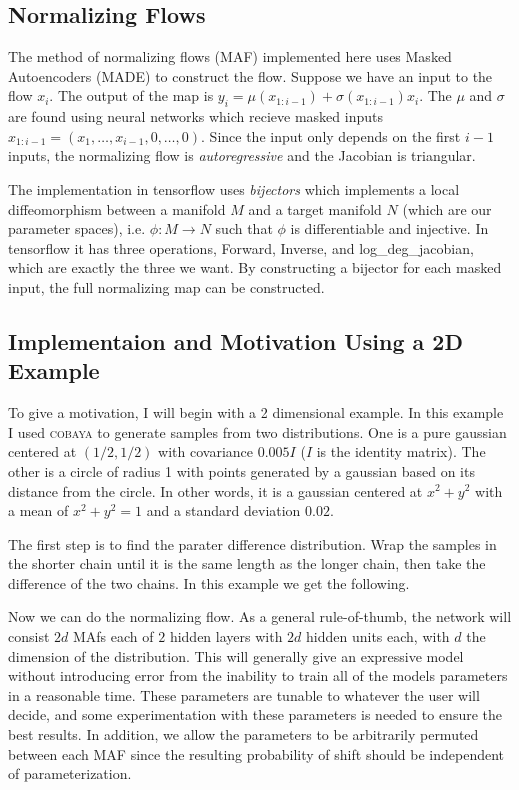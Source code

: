 \subsection{Normalizing Flows}
The method of normalizing flows (MAF) implemented here uses Masked Autoencoders (MADE) to construct the flow. Suppose we have an input to the flow $x_i$. The output of the map is $y_i= \mu(x_{1:i-1})+\sigma(x_{1:i-1})x_i$. The $\mu$ and $\sigma$ are found using neural networks which recieve masked inputs $x_{1:i-1}=(x_1,\ldots,x_{i-1},0,\ldots,0)$. Since the input only depends on the first $i-1$ inputs, the normalizing flow is \textit{autoregressive} and the Jacobian is triangular.

The implementation in tensorflow uses \textit{bijectors} which implements a local diffeomorphism between a manifold $M$ and a target manifold $N$ (which are our parameter spaces), i.e. $\phi:M\rightarrow N$ such that $\phi$ is differentiable and injective. In tensorflow it has three operations, Forward, Inverse, and log\_deg\_jacobian, which are exactly the three we want. By constructing a bijector for each masked input, the full normalizing map can be constructed.

\subsection{Implementaion and Motivation Using a 2D Example}
To give a motivation, I will begin with a 2 dimensional example. In this example I used \textsc{cobaya} to generate samples from two distributions. One is a pure gaussian centered at $(1/2,1/2)$ with covariance $0.005 I$  ($I$ is the identity matrix). The other is a circle of radius 1 with points generated by a gaussian based on its distance from the circle. In other words, it is a gaussian centered at $x^2+y^2$ with a mean of $x^2+y^2=1$ and a standard deviation $0.02$.

The first step is to find the parater difference distribution. Wrap the samples in the shorter chain until it is the same length as the longer chain, then take the difference of the two chains. In this example we get the following.

Now we can do the normalizing flow. As a general rule-of-thumb, the network will consist $2d$ MAfs each of $2$ hidden layers with $2d$ hidden units each, with $d$ the dimension of the distribution.
This will generally give an expressive model without introducing error from the inability to train all of the models parameters in a reasonable time. 
These parameters are tunable to whatever the user will decide, and some experimentation with these parameters is needed to ensure the best results.
In addition, we allow the parameters to be arbitrarily permuted between each MAF since the resulting probability of shift should be independent of parameterization.

